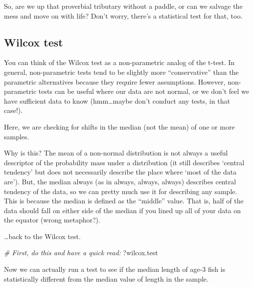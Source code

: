 \documentclass[
]{book}
\newenvironment{Shaded}{\begin{snugshade}}{\end{snugshade}}
\newcommand{\CommentTok}[1]{\textcolor[rgb]{0.56,0.35,0.01}{\textit{#1}}}
\newcommand{\DataTypeTok}[1]{\textcolor[rgb]{0.13,0.29,0.53}{#1}}
\newcommand{\KeywordTok}[1]{\textcolor[rgb]{0.13,0.29,0.53}{\textbf{#1}}}
\newcommand{\NormalTok}[1]{#1}
\newcommand{\OperatorTok}[1]{\textcolor[rgb]{0.81,0.36,0.00}{\textbf{#1}}}
\newcommand{\OtherTok}[1]{\textcolor[rgb]{0.56,0.35,0.01}{#1}}
\newcommand{\StringTok}[1]{\textcolor[rgb]{0.31,0.60,0.02}{#1}}
\begin{document}
So, are we up that proverbial tributary without a paddle, or can we salvage the mess and move on with life? Don't worry, there's a statistical test for that, too.

\hypertarget{wilcox-test}{%
\subsection{Wilcox test}\label{wilcox-test}}

You can think of the Wilcox test as a non-parametric analog of the t-test. In general, non-parametric tests tend to be slightly more ``conservative'' than the parametric alternatives because they require fewer assumptions. However, non-parametric tests can be useful where our data are not normal, or we don't feel we have sufficient data to know (hmm\ldots maybe don't conduct any tests, in that case!).

Here, we are checking for shifts in the median (not the mean) of one or more samples.

Why is this? The mean of a non-normal distribution is not always a useful descriptor of the probability mass under a distribution (it still describes `central tendency' but does not necessarily describe the place where `most of the data are'). But, the median always (as in always, always, always) describes central tendency of the data, so we can pretty much use it for describing any sample. This is because the median is defined as the ``middle'' value. That is, half of the data should fall on either side of the median if you lined up all of your data on the equator (wrong metaphor?).

\ldots back to the Wilcox test.

\begin{Shaded}
\begin{Highlighting}[]
\CommentTok{# First, do this and have a quick read:}
\NormalTok{  ?wilcox.test}
\end{Highlighting}
\end{Shaded}

Now we can actually run a test to see if the median length of age-3 fish is statistically different from the median value of length in the sample.

\begin{Shaded}
\end{Shaded}
\end{document}
